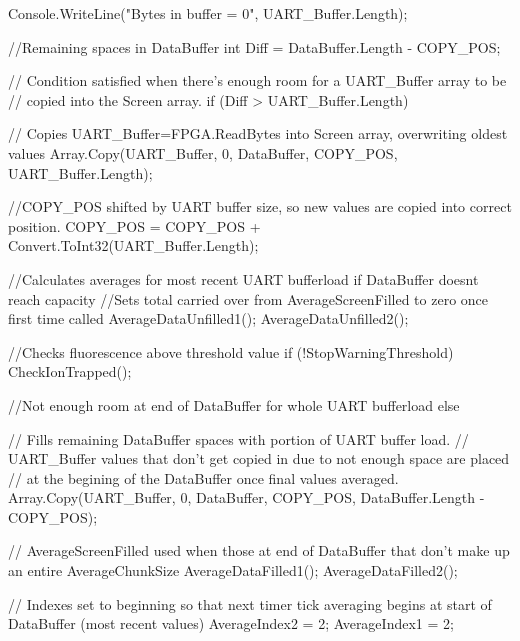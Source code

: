 {{{{{                   
                    Console.WriteLine("Bytes in buffer = {0}", UART_Buffer.Length);
                    
                    //Remaining spaces in DataBuffer
                    int Diff = DataBuffer.Length - COPY_POS;

                    // Condition satisfied when there's enough room for a UART_Buffer array to be
                    // copied into the Screen array.
                    if (Diff > UART_Buffer.Length)
                    {
                        // Copies UART_Buffer=FPGA.ReadBytes into Screen array, overwriting oldest values
                        Array.Copy(UART_Buffer, 0, DataBuffer, COPY_POS, UART_Buffer.Length);

                        //COPY_POS shifted by UART buffer size, so new values are copied into correct position.
                        COPY_POS = COPY_POS + Convert.ToInt32(UART_Buffer.Length);


                        //Calculates averages for most recent UART bufferload if DataBuffer doesnt reach capacity
                        //Sets total carried over from AverageScreenFilled to zero once first time called
                        AverageDataUnfilled1();
                        AverageDataUnfilled2();

                        //Checks fluorescence above threshold value
                        if (!StopWarningThreshold)
                        {
                            CheckIonTrapped();
                        }
                    }

                    //Not enough room at end of DataBuffer for whole UART bufferload
                    else
                    {
                        // Fills remaining DataBuffer spaces with portion of UART buffer load.
                        // UART_Buffer values that don't get copied in due to not enough space are placed
                        // at the begining of the DataBuffer once final values averaged.
                        Array.Copy(UART_Buffer, 0, DataBuffer, COPY_POS, DataBuffer.Length - COPY_POS);

                        // AverageScreenFilled used when those at end of DataBuffer that don't make up an entire AverageChunkSize
                        AverageDataFilled1();
                        AverageDataFilled2();

                        // Indexes set to beginning so that next timer tick averaging begins at start of DataBuffer (most recent values)
                        AverageIndex2 = 2;
                        AverageIndex1 = 2;

}}}}}}
